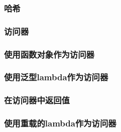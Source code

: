 \subsubsection*{哈希}

\subsubsection{访问器}
\subsubsection*{使用函数对象作为访问器}
\subsubsection*{使用泛型lambda作为访问器}\label{ch16.3.3.2}
\subsubsection*{在访问器中返回值}
\subsubsection*{使用重载的lambda作为访问器}\label{ch16.3.3.4}
